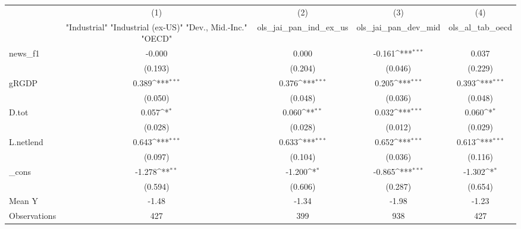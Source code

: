 {
\def\sym#1{\ifmmode^{#1}\else\(^{#1}\)\fi}
\begin{tabular}{l*{4}{c}}
\toprule
            &\multicolumn{1}{c}{(1)}&\multicolumn{1}{c}{(2)}&\multicolumn{1}{c}{(3)}&\multicolumn{1}{c}{(4)}\\
            &\multicolumn{1}{c}{ "Industrial" "Industrial (ex-US)" "Dev., Mid.-Inc." "OECD" }&\multicolumn{1}{c}{ols\_jai\_pan\_ind\_ex\_us}&\multicolumn{1}{c}{ols\_jai\_pan\_dev\_mid}&\multicolumn{1}{c}{ols\_al\_tab\_oecd}\\
\midrule
news\_f1     &      -0.000         &       0.000         &      -0.161\sym{***}&       0.037         \\
            &     (0.193)         &     (0.204)         &     (0.046)         &     (0.229)         \\
\addlinespace
gRGDP       &       0.389\sym{***}&       0.376\sym{***}&       0.205\sym{***}&       0.393\sym{***}\\
            &     (0.050)         &     (0.048)         &     (0.036)         &     (0.048)         \\
\addlinespace
D.tot       &       0.057\sym{*}  &       0.060\sym{**} &       0.032\sym{***}&       0.060\sym{*}  \\
            &     (0.028)         &     (0.028)         &     (0.012)         &     (0.029)         \\
\addlinespace
L.netlend   &       0.643\sym{***}&       0.633\sym{***}&       0.652\sym{***}&       0.613\sym{***}\\
            &     (0.097)         &     (0.104)         &     (0.036)         &     (0.116)         \\
\addlinespace
\_cons      &      -1.278\sym{**} &      -1.200\sym{*}  &      -0.865\sym{***}&      -1.302\sym{*}  \\
            &     (0.594)         &     (0.606)         &     (0.287)         &     (0.654)         \\
\midrule
Mean Y      &       -1.48         &       -1.34         &       -1.98         &       -1.23         \\
Observations&         427         &         399         &         938         &         427         \\
\bottomrule
\end{tabular}
}
